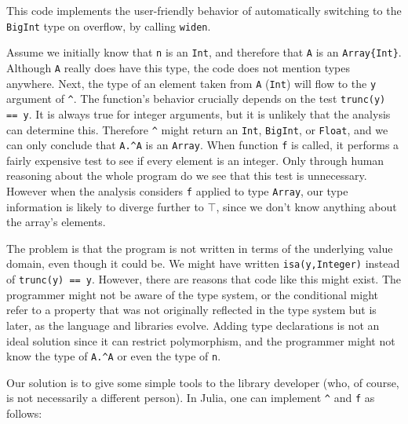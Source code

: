 \noindent
This code implements the user-friendly behavior of automatically switching to the
\texttt{BigInt} type on overflow, by calling \texttt{widen}.

Assume we initially know that \texttt{n} is an \texttt{Int}, and therefore
that \texttt{A} is an \texttt{Array\{Int\}}.
Although \texttt{A} really does have this type, the code does not mention
types anywhere.
Next, the type of an element taken from \texttt{A} (\texttt{Int}) will
flow to the \texttt{y} argument of \texttt{\^}.
The function's behavior crucially depends on the test \texttt{trunc(y) == y}.
It is always true for integer arguments, but it is unlikely that the
analysis can determine this.
Therefore \texttt{\^} might return an \texttt{Int}, \texttt{BigInt}, or
\texttt{Float}, and we can only conclude that \texttt{A.\^{}A} is an
\texttt{Array}.
When function \texttt{f} is called, it performs a fairly expensive test
to see if every element is an integer.
Only through human reasoning about the whole program do we see that
this test is unnecessary.
However when the analysis considers \texttt{f} applied to type
\texttt{Array}, our type information is likely to diverge further to
\texttt{$\top$}, since we don't know anything about the array's elements.

The problem is that the program is not written in terms of the
underlying value domain, even though it could be.
We might have written \texttt{isa(y,Integer)} instead of \texttt{trunc(y) == y}.
However, there are reasons that code like this might exist.
The programmer might not be aware of the type system, or the conditional
might refer to a property that was not originally reflected in the type system
but is later, as the language and libraries evolve.
Adding type declarations is not an ideal solution since it can restrict
polymorphism, and the programmer might not know the type of \texttt{A.\^{}A}
or even the type of \texttt{n}.


\iffalse
How can we fix this?
One solution is to add type annotations.
But the author of the original code does not know the type of
\texttt{A.\^{}A}, and might not even know the type of \texttt{n}.
Another solution is to improve the analysis.
But we will never finish adding cases to the compiler.
Perhaps we can handle \texttt{trunc(y) == y}, but will we also be
able to understand \texttt{trunc(y) == 1*y}?
\fi

Our solution is to give some simple tools to the library developer
(who, of course, is not necessarily a different person).
In Julia, one can implement \texttt{\^} and \texttt{f} as follows:


